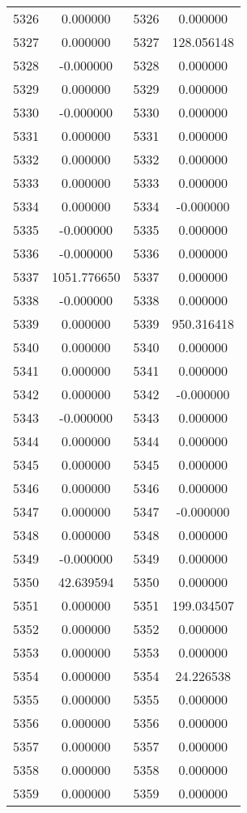 \documentclass[12pt]{article}
\begin{document}
\begin{longtable}{@{}cccc@{}}
5326 & 0.000000 & 5326 & 0.000000 \\
5327 & 0.000000 & 5327 & 128.056148 \\
5328 & -0.000000 & 5328 & 0.000000 \\
5329 & 0.000000 & 5329 & 0.000000 \\
5330 & -0.000000 & 5330 & 0.000000 \\
5331 & 0.000000 & 5331 & 0.000000 \\
5332 & 0.000000 & 5332 & 0.000000 \\
5333 & 0.000000 & 5333 & 0.000000 \\
5334 & 0.000000 & 5334 & -0.000000 \\
5335 & -0.000000 & 5335 & 0.000000 \\
5336 & -0.000000 & 5336 & 0.000000 \\
5337 & 1051.776650 & 5337 & 0.000000 \\
5338 & -0.000000 & 5338 & 0.000000 \\
5339 & 0.000000 & 5339 & 950.316418 \\
5340 & 0.000000 & 5340 & 0.000000 \\
5341 & 0.000000 & 5341 & 0.000000 \\
5342 & 0.000000 & 5342 & -0.000000 \\
5343 & -0.000000 & 5343 & 0.000000 \\
5344 & 0.000000 & 5344 & 0.000000 \\
5345 & 0.000000 & 5345 & 0.000000 \\
5346 & 0.000000 & 5346 & 0.000000 \\
5347 & 0.000000 & 5347 & -0.000000 \\
5348 & 0.000000 & 5348 & 0.000000 \\
5349 & -0.000000 & 5349 & 0.000000 \\
5350 & 42.639594 & 5350 & 0.000000 \\
5351 & 0.000000 & 5351 & 199.034507 \\
5352 & 0.000000 & 5352 & 0.000000 \\
5353 & 0.000000 & 5353 & 0.000000 \\
5354 & 0.000000 & 5354 & 24.226538 \\
5355 & 0.000000 & 5355 & 0.000000 \\
5356 & 0.000000 & 5356 & 0.000000 \\
5357 & 0.000000 & 5357 & 0.000000 \\
5358 & 0.000000 & 5358 & 0.000000 \\
5359 & 0.000000 & 5359 & 0.000000 \\

\end{longtable}
\end{document}
